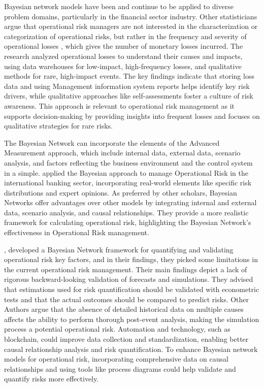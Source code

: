 Bayesian network models have been and continue to be applied to diverse problem domains, particularly in the financial sector industry. Other statisticians argue that operational risk managers are not interested in the characterization or categorization of operational risks, but rather in the frequency and severity of operational losses \parencite{hager2010knowledge}, which gives the number of monetary losses incurred. The research analyzed operational losses to understand their causes and impacts, using data warehouses for low-impact, high-frequency losses, and qualitative methods for rare, high-impact events. The key findings indicate that storing loss data and using Management information system reports helps identify key risk drivers, while qualitative approaches like self-assessments foster a culture of risk awareness. This approach is relevant to operational risk management as it supports decision-making by providing insights into frequent losses and focuses on qualitative strategies for rare risks.

The Bayesian Network can incorporate the elements of the Advanced Measurement approach, which include internal data, external data, scenario analysis, and factors reflecting the business environment and the control system in a simple. \textcite{martinez2016analysis} applied the Bayesian approach to manage Operational Risk in the international banking sector, incorporating real-world elements like specific risk distributions and expert opinions. As preferred by other scholars, Bayesian Networks offer advantages over other models by integrating internal and external data, scenario analysis, and causal relationships. They provide a more realistic framework for calculating operational risk, highlighting the Bayesian Network's effectiveness in Operational Risk management.

\textcite{tudor_operational_2017}, developed a Bayesian Network framework for quantifying and validating operational risk key factors, and in their findings, they picked some limitations in the current operational risk management. Their main findings depict a lack of rigorous backward-looking validation of forecasts and simulations. They advised that estimations used for risk quantification should be validated with econometric tests and that the actual outcomes should be compared to predict risks. Other Authors argue that the absence of detailed historical data on multiple causes affects the ability to perform thorough post-event analysis, making the simulation process a potential operational risk. Automation and technology, such as blockchain, could improve data collection and standardization, enabling better causal relationship analysis and risk quantification. To enhance Bayesian network models for operational risk, incorporating comprehensive data on causal relationships and using tools like process diagrams could help validate and quantify risks more effectively.

